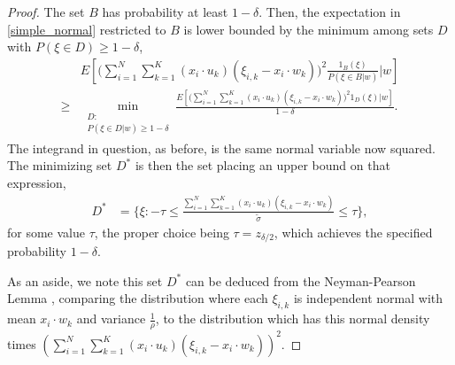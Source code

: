 \documentclass{article}
\numberwithin{equation}{section}
\theoremstyle{Lemma}
\theoremstyle{Corollary}
\theoremstyle{Theorem}
\theoremstyle{Remark}
\begin{document}
\begin{proof}
The set $B$ has probability at least $1-\delta$.
Then, the expectation in \eqref{simple_normal} restricted to $B$ is lower bounded by the minimum among sets $D$ with $P(\xi \in D) \geq 1-\delta$,
\begin{align}
    &E[\Big(\sum_{i=1}^{N}\sum_{k=1}^{K}(x_{i}\cdot u_{k})(\xi_{i,k}-x_{i}\cdot w_{k})\Big)^{2}\frac{1_{B}(\xi)}{P(\xi \in B|w)}|w]\\
    \geq&\min_{\substack{D:\\P(\xi \in D|w) \geq 1-\delta} } \frac{E[\Big(\sum_{i=1}^{N}\sum_{k=1}^{K}(x_{i}\cdot u_{k})(\xi_{i,k}-x_{i}\cdot w_{k})\Big)^{2}1_{D}(\xi)|w]}{1-\delta}.
\end{align}
The integrand in question, as before, is the same normal variable now squared. The minimizing set $D^{*}$ is then the set placing an upper bound on that expression,
\begin{align}
    D^{*}&=\{\xi:-\tau \leq \frac{\sum_{i=1}^{N}\sum_{k=1}^{K}(x_{i}\cdot u_{k})(\xi_{i,k}-x_{i}\cdot w_{k})}{\tilde{\sigma}} \leq \tau\},
\end{align}
for some value $\tau$, the proper choice being $\tau = z_{\delta/2}$, which achieves the specified probability $1-\delta$.

As an aside, we note this set $D^{*}$ can be deduced from the Neyman-Pearson Lemma \cite[Theorem 3.2.1]{lehmann1986testing}, comparing the distribution where each $\xi_{i,k}$ is independent normal with mean $x_{i} \cdot w_{k}$ and variance $\frac{1}{\rho}$, to the distribution which has this normal density times $(\sum_{i=1}^{N}\sum_{k=1}^{K}(x_{i}\cdot u_{k})(\xi_{i,k}-x_{i}\cdot w_{k}))^{2}$. %


\end{proof}
\end{document}
